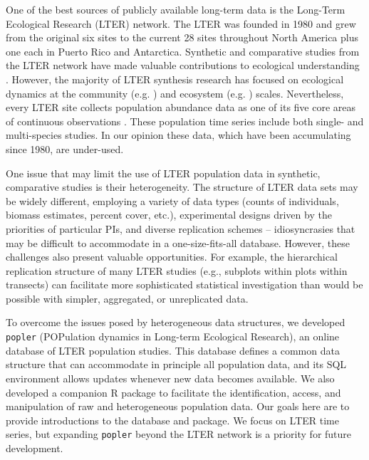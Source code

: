 \documentclass{article}\usepackage[]{graphicx}\usepackage[]{color}
\begin{document}
One of the best sources of publicly available long-term data is the Long-Term Ecological Research (LTER) network. The LTER was founded in 1980 and grew from the original six sites to the current 28 sites throughout North America plus one each in Puerto Rico and Antarctica. Synthetic and comparative studies from the LTER network have made valuable contributions to ecological understanding \citep{Knapp2012}. However, the majority of LTER synthesis research has focused on ecological dynamics at the community (e.g. \cite{Wilcox2017}) and ecosystem (e.g. \cite{Knapp2001}) scales. Nevertheless, every LTER site collects population abundance data as one of its five core areas of continuous observations \citep{Callahan1984}. These population time series include both single- and multi-species studies. In our opinion these data, which have been accumulating since 1980, are under-used. 

One issue that may limit the use of LTER population data in synthetic, comparative studies is their heterogeneity. The structure of LTER data sets may be widely different, employing a variety of data types (counts of individuals, biomass estimates, percent cover, etc.), experimental designs driven by the priorities of particular PIs, and diverse replication schemes – idiosyncrasies that may be difficult to accommodate in a one-size-fits-all database. However, these challenges also present valuable opportunities. For example, the hierarchical replication structure of many LTER studies (e.g., subplots within plots within transects) can facilitate more sophisticated statistical investigation than would be possible with simpler, aggregated, or unreplicated data. %

To overcome the issues posed by heterogeneous data structures, we developed \texttt{popler} (POPulation dynamics in Long-term Ecological Research), an online database of LTER population studies. This database defines a common data structure that can accommodate in principle all population data, and its SQL environment allows updates whenever new data becomes available. We also developed a companion R package to facilitate the identification, access, and manipulation of raw and heterogeneous population data. Our goals here are to provide introductions to the database and package. We focus on LTER time series, but expanding \texttt{popler} beyond the LTER network is a priority for future development.
\end{document}
